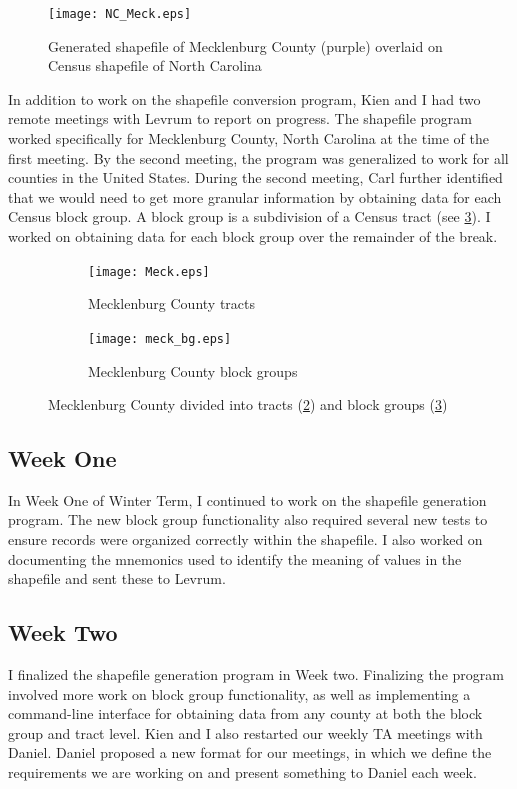 \documentclass[onecolumn, draftclsnofoot,10pt, compsoc]{IEEEtran}
\begin{document}
\begin{singlespace}
\begin{figure}[h!]
    \centering
    \texttt{[image: NC\_Meck.eps]}
    \caption{Generated shapefile of Mecklenburg County (purple) overlaid on Census shapefile of North Carolina}
    \label{fig:nc_meck_shp}
\end{figure}

In addition to work on the shapefile conversion program, Kien and I had two remote meetings with Levrum to report on progress. The shapefile program worked specifically for Mecklenburg County, North Carolina at the time of the first meeting. By the second meeting, the program was generalized to work for all counties in the United States. During the second meeting, Carl further identified that we would need to get more granular information by obtaining data for each Census block group. A block group is a subdivision of a Census tract (see \ref{fig:meck_bg}). I worked on obtaining data for each block group over the remainder of the break.


\begin{figure}
\centering
\begin{subfigure}{.5\textwidth}
  \centering
  \texttt{[image: Meck.eps]}
  \caption{Mecklenburg County tracts}
  \label{fig:meck_tracts}
\end{subfigure}%
\begin{subfigure}{.5\textwidth}
  \centering
  \texttt{[image: meck\_bg.eps]}
  \caption{Mecklenburg County block groups}
  \label{fig:meck_bg}
\end{subfigure}
\caption{Mecklenburg County divided into tracts (\ref{fig:meck_tracts}) and block groups (\ref{fig:meck_bg})}
\label{fig:bg_tract_cmp}
\end{figure}


\subsection{Week One}
In Week One of Winter Term, I continued to work on the shapefile generation program. The new block group functionality also required several new tests to ensure records were organized correctly within the shapefile. I also worked on documenting the mnemonics used to identify the meaning of values in the shapefile and sent these to Levrum. 

\subsection{Week Two}
I finalized the shapefile generation program in Week two. Finalizing the program involved more work on block group functionality, as well as implementing a command-line interface for obtaining data from any county at both the block group and tract level. Kien and I also restarted our weekly TA meetings with Daniel. Daniel proposed a new format for our meetings, in which we define the requirements we are working on and present something to Daniel each week. 


\end{singlespace}
\end{document}
